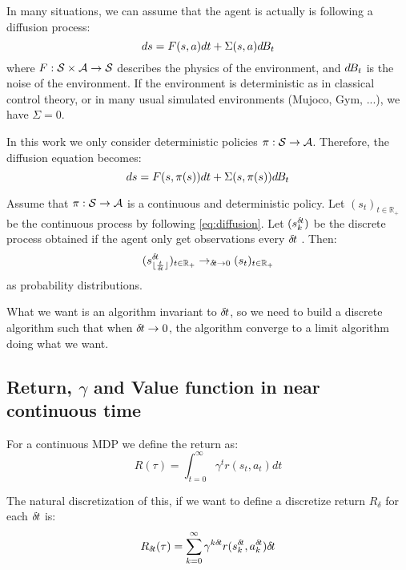 In many situations, we can assume that the agent is actually is following a diffusion process:
\begin{equation}
  \label{eq:diffusion}
  ds = F(s, a)dt + \Sigma(s, a)d\hspace{-.1em}B_t
\end{equation}
where $F: {\cal S}\times{\cal A}\rightarrow {\cal S}$ describes the physics of the environment, and $d\hspace{-.1em}B_t$ is the noise of the environment. If the environment is deterministic as in classical control theory, or in many usual simulated environments (Mujoco, Gym, ...), we have $\Sigma = 0$.

In this work we only consider deterministic policies $\pi: {\cal S} \rightarrow {\cal A}$. Therefore, the diffusion equation becomes:
\begin{equation}
  \label{eq:diffusion-policy}
  ds = F(s, \pi(s))dt + \Sigma(s, \pi(s))d\hspace{-.1em}B_t
\end{equation}

\begin{theorem}
  Assume that $\pi: {\cal S} \rightarrow {\cal A}$ is a continuous and deterministic policy. Let $(s_t)_{t\in\mathbb{R}_+}$ be the continuous process by following \eqref{eq:diffusion}. Let $(s^{\delta\hspace{-.1em}t}_k)$ be the discrete process obtained if the agent only get observations every ${\delta\hspace{-.1em}t}$ . Then:
  \begin{equation}
    \label{eq:conv-traj}
    (s_{\lfloor \frac{t}{{\delta\hspace{-.1em}t}}\rfloor}^{\delta\hspace{-.1em}t})_{t\in\mathbb{R}_+} \rightarrow_{{\delta\hspace{-.1em}t} \rightarrow 0} (s_t)_{t\in\mathbb{R}_+}
  \end{equation}
  as probability distributions.
\end{theorem}


What we want is an algorithm invariant to ${\delta\hspace{-.1em}t}$, so we need to build a discrete algorithm such that when ${\delta\hspace{-.1em}t} \rightarrow 0$, the algorithm converge to a limit algorithm doing what we want.


\subsection{Return, $\gamma$ and Value function in near continuous time}
\label{sec:ret-gamma-v}

For a continuous MDP we define the return as:
\begin{equation}
  \label{eq:continuous-return}
  R(\tau) = \int_{t=0}^\infty\gamma^tr(s_t, a_t)dt
\end{equation}

The natural discretization of this, if we want to define a discretize return $R_\delta$ for each ${\delta\hspace{-.1em}t}$ is:
\begin{equation}
  \label{eq:discretized-return}
  R_{\delta\hspace{-.1em}t}(\tau) = \sum_{k=0}^\infty\gamma^{k{\delta\hspace{-.1em}t}}r(s^{\delta\hspace{-.1em}t}_k, a^{\delta\hspace{-.1em}t}_k){\delta\hspace{-.1em}t}
\end{equation}

